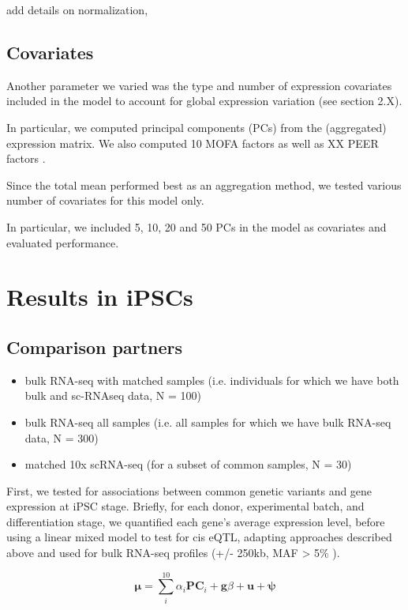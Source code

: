 add details on normalization, 

\subsection{Covariates}

Another parameter we varied was the type and number of expression covariates included in the model to account for global expression variation (see section 2.X).

In particular, we computed principal components (PCs) from the (aggregated) expression matrix.
We also computed 10 MOFA factors \cite{argelaguet2018multi} as well as XX PEER factors \cite{stegle2010bayesian,stegle2012using}.

Since the total mean performed best as an aggregation method, we tested various number of covariates for this model only.

In particular, we included 5, 10, 20 and 50 PCs in the model as covariates and evaluated performance.

\section{Results in iPSCs}

\subsection{Comparison partners}

\begin{itemize}
    \item bulk RNA-seq with matched samples (i.e. individuals for which we have both bulk and sc-RNAseq data, N = 100)
    \item bulk RNA-seq all samples (i.e. all samples for which we have bulk RNA-seq data, N = 300)
    \item matched 10x scRNA-seq (for a subset of common samples, N = 30)
\end{itemize}


First, we tested for associations between common genetic variants and gene expression at iPSC stage. 
Briefly, for each donor, experimental batch, and differentiation stage, we quantified each gene’s average expression level, before using a linear mixed model to test for cis eQTL, adapting approaches described above and used for bulk RNA-seq profiles (+/- 250kb, MAF > 5\% \cite{kilpinen2017common}). 

\begin{equation}
    \boldsymbol{\mu} = \sum_i^{10}\alpha_i \mathbf{PC}_i + \mathbf{g}\beta + \mathbf{u} + \boldsymbol{\psi}  
\end{equation}

